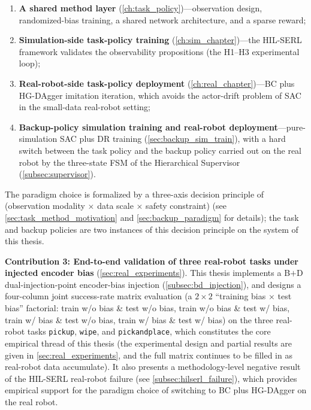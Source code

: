 \begin{enumerate}
  \item \textbf{A shared method layer} (\cref{ch:task_policy})---observation design, randomized-bias training, a shared network architecture, and a sparse reward;
  \item \textbf{Simulation-side task-policy training} (\cref{ch:sim_chapter})---the HIL-SERL framework validates the observability propositions (the H1--H3 experimental loop);
  \item \textbf{Real-robot-side task-policy deployment} (\cref{ch:real_chapter})---BC plus HG-DAgger imitation iteration, which avoids the actor-drift problem of SAC in the small-data real-robot setting;
  \item \textbf{Backup-policy simulation training and real-robot deployment}---pure-simulation SAC plus DR training (\cref{sec:backup_sim_train}), with a hard switch between the task policy and the backup policy carried out on the real robot by the three-state FSM of the Hierarchical Supervisor (\cref{subsec:supervisor}).
\end{enumerate}

\noindent The paradigm choice is formalized by a three-axis decision principle of (observation modality $\times$ data scale $\times$ safety constraint) (see \cref{sec:task_method_motivation} and \cref{sec:backup_paradigm} for details); the task and backup policies are two instances of this decision principle on the system of this thesis.

\textbf{Contribution 3: End-to-end validation of three real-robot tasks under injected encoder bias} (\cref{sec:real_experiments}). This thesis implements a B$+$D dual-injection-point encoder-bias injection (\cref{subsec:bd_injection}), and designs a four-column joint success-rate matrix evaluation (a $2\times2$ ``training bias $\times$ test bias'' factorial: train w/o bias \& test w/o bias, train w/o bias \& test w/ bias, train w/ bias \& test w/o bias, train w/ bias \& test w/ bias) on the three real-robot tasks \texttt{pickup}, \texttt{wipe}, and \texttt{pickandplace}, which constitutes the core empirical thread of this thesis (the experimental design and partial results are given in \cref{sec:real_experiments}, and the full matrix continues to be filled in as real-robot data accumulate). It also presents a methodology-level negative result of the HIL-SERL real-robot failure (see \cref{subsec:hilserl_failure}), which provides empirical support for the paradigm choice of switching to BC plus HG-DAgger on the real robot.

